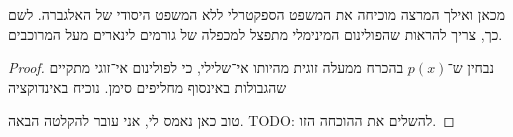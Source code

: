 \documentclass[]{../../../../tex/classes/styledArticle}
\begin{document}
	מכאן ואילך המרצה מוכיחה את המשפט הספקטרלי ללא המשפט היסודי של האלגברה. לשם כך, צריך להראות שהפולינום המינימלי מתפצל למכפלה של גורמים לינארים מעל המרוכבים. 
	
	\begin{proof}
		נבחין ש־$p(x)$ בהכרח ממעלה זוגית מהיותו אי־שלילי, כי לפולינום אי־זוגי מתקיים שהגבולות באינסוף מחליפים סימן. נוכיח באינדוקציה 
		
		טוב כאן נאמס לי, אני עובר להקלטה הבאה. 
		TODO: להשלים את ההוכחה הזו. 
	\end{proof}
	
	\ndoc
\end{document}
